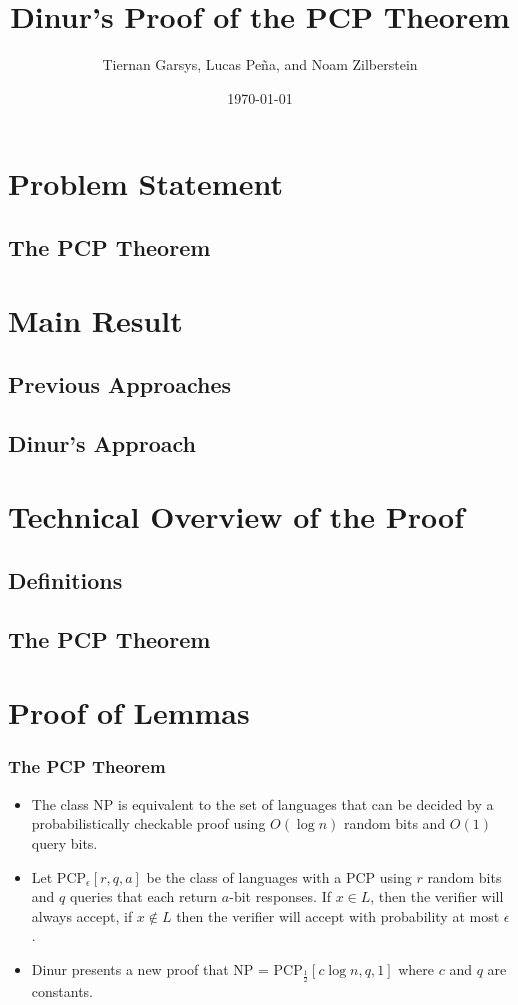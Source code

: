 \documentclass{beamer}
\title{Dinur's Proof of the PCP Theorem}
\author{Tiernan Garsys, Lucas Pe\~{n}a, and Noam Zilberstein}
\date{\today}
\begin{document}
\frame{\titlepage}

\section[Outline]{}
\frame{\tableofcontents}

\section{Problem Statement}
\subsection{The PCP Theorem}
\subsection{}
\section{Main Result}
\subsection{Previous Approaches}
\subsection{Dinur's Approach}
\section{Technical Overview of the Proof}
\subsection{Definitions}
\subsection{The PCP Theorem}
\section{Proof of Lemmas}
\frame
{
  \frametitle{The PCP Theorem}

  \begin{itemize}
  \item The class NP is equivalent to the set of languages that can be decided by a probabilistically checkable proof using $O(\log n)$ random bits and $O(1)$ query bits.
  \item Let PCP$_{\epsilon}[r, q, a]$ be the class of languages with a PCP using $r$ random bits and $q$ queries that each return $a$-bit responses.  If $x\in L$, then the verifier will always accept, if $x\not\in L$ then the verifier will accept with probability at most $\epsilon$.   
  \item Dinur presents a new proof that NP = PCP$_\frac12[c\log n, q, 1]$ where $c$ and $q$ are constants. 
  \end{itemize}
}
\end{document}
